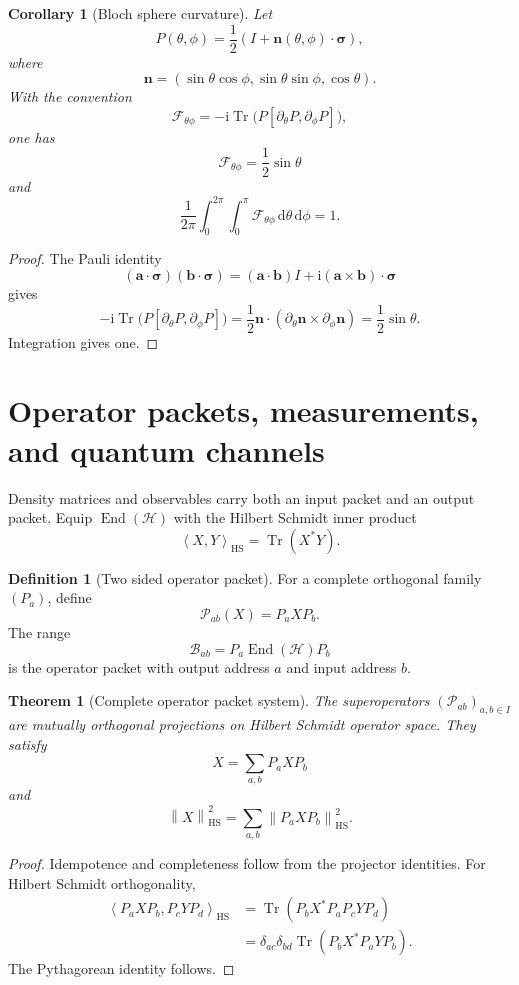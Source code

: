\documentclass{aomart}
\newtheorem{theorem}{Theorem}[section]
\newtheorem{corollary}[corollary]{Corollary}
\theoremstyle{definition}
\newtheorem{definition}[definition]{Definition}
\theoremstyle{remark}
\newcommand{\Hcal}{\mathcal H}
\newcommand{\Bcal}{\mathcal B}
\newcommand{\Fcal}{\mathcal F}
\newcommand{\Pcal}{\mathcal P}
\newcommand{\End}{\operatorname{End}}
\newcommand{\Tr}{\operatorname{Tr}}
\newcommand{\ii}{\mathrm i}
\newcommand{\dd}{\,\mathrm d}
\newcommand{\norm}[1]{\left\lVert#1\right\rVert}
\newcommand{\ip}[2]{\left\langle#1,#2\right\rangle}
\newcommand{\HS}{\mathrm{HS}}
\begin{document}
\begin{corollary}[Bloch sphere curvature]\label{cor:bloch_curvature}
Let
\[
P(\theta,\phi)
=
\frac12\left(I+\bm n(\theta,\phi)\cdot\bm\sigma\right),
\]
where
\[
\bm n=(\sin\theta\cos\phi,\sin\theta\sin\phi,\cos\theta).
\]
With the convention
\[
\Fcal_{\theta\phi}
=-\ii\Tr\bigl(P[\partial_\theta P,\partial_\phi P]\bigr),
\]
one has
\[
\Fcal_{\theta\phi}=\frac12\sin\theta
\]
and
\[
\frac1{2\pi}
\int_0^{2\pi}\int_0^\pi
\Fcal_{\theta\phi}\dd\theta\dd\phi
=1.
\]
\end{corollary}

\begin{proof}
The Pauli identity
\[
(\bm a\cdot\bm\sigma)(\bm b\cdot\bm\sigma)
=(\bm a\cdot\bm b)I
+\ii(\bm a\times\bm b)\cdot\bm\sigma
\]
gives
\[
-\ii\Tr\bigl(P[\partial_\theta P,\partial_\phi P]\bigr)
=\frac12
\bm n\cdot
(\partial_\theta\bm n\times\partial_\phi\bm n)
=\frac12\sin\theta.
\]
Integration gives one.
\end{proof}

\section{Operator packets, measurements, and quantum channels}\label{sec:channels}

Density matrices and observables carry both an input packet and an output packet. Equip \(\End(\Hcal)\) with the Hilbert Schmidt inner product
\[
\ip{X}{Y}_{\HS}=\Tr(X^*Y).
\]

\begin{definition}[Two sided operator packet]\label{def:operator_packet}
For a complete orthogonal family \((P_a)\), define
\[
\Pcal_{ab}(X)=P_aXP_b.
\]
The range
\[
\Bcal_{ab}=P_a\End(\Hcal)P_b
\]
is the operator packet with output address \(a\) and input address \(b\).
\end{definition}

\begin{theorem}[Complete operator packet system]\label{thm:operator_packets}
The superoperators \((\Pcal_{ab})_{a,b\in I}\) are mutually orthogonal projections on Hilbert Schmidt operator space. They satisfy
\[
X=\sum_{a,b}P_aXP_b
\]
and
\[
\norm{X}_{\HS}^2
=
\sum_{a,b}\norm{P_aXP_b}_{\HS}^2.
\]
\end{theorem}

\begin{proof}
Idempotence and completeness follow from the projector identities. For Hilbert Schmidt orthogonality,
\[
\begin{aligned}
\ip{P_aXP_b}{P_cYP_d}_{\HS}
&=
\Tr(P_bX^*P_aP_cYP_d)\\
&=
\delta_{ac}\delta_{bd}
\Tr(P_bX^*P_aYP_b).
\end{aligned}
\]
The Pythagorean identity follows.
\end{proof}
\end{document}
